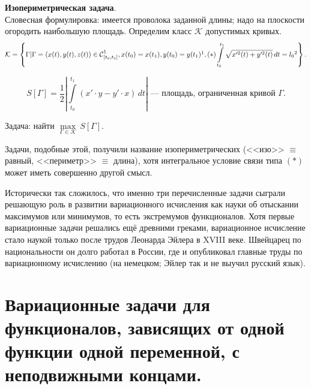 \documentclass[12pt,a4paper,openany,fleqn]{book}
\newcommand{\Cf}{\ensuremath{\mathcal{C}}}
\newcommand{\mc}[1]{\ensuremath{\mathcal{#1}}}
\newcommand{\Cfn}[2][]{\ensuremath{\Cf{\mathstrut}^{#2}_{#1}}}
\theoremstyle{definition}
\begin{document}
\begin{enumerate2}
		\item \textbf{Изопериметрическая задача}.\\
		Словесная формулировка: имеется проволока заданной длины; надо на плоскости огородить наибольшую площадь. Определим класс $\mc{K}$ допустимых кривых.
		\label{l1:eq:Isoperimetr} 
		\begin{equation*}
			\mc{K}=\left\{\Gamma|\Gamma=(x(t),y(t),z(t))\in\Cfn[{[t_0,t_1]}]{1}, x(t_0)=x(t_1), y(t_0)=y(t_1)\footnotemark{}, (*)\int\limits_{t_0}^{t_1}\sqrt{x^{\prime 2}(t)+y^{\prime 2}(t)}\,dt=l_0\footnotemark{}\right\}.
		\end{equation*}
		\addtocounter{footnote}{-1}\addtocounter{footnote}{1}
		\begin{equation*}
			S[\Gamma]=\frac12\left|\int\limits_{t_0}^{t_1}\left(x'\cdot y-y'\cdot x\right)\,dt\right|\text{ --- площадь, ограниченная кривой }\Gamma.
		\end{equation*}
		
		Задача: найти $\max\limits_{\Gamma\in\mc{K}}\,S[\Gamma].$
		
		Задачи, подобные этой, получили название изопериметрических (<<изо>> $\equiv$ равный,  <<периметр>> $\equiv$ длина), хотя интегральное условие связи типа $(\hyperref[l1:eq:Isoperimetr]{*})$ может иметь совершенно другой смысл.
	\end{enumerate2}
	
	Исторически так сложилось, что именно три перечисленные задачи сыграли решающую роль в развитии вариационного исчисления как науки об отыскании максимумов или минимумов, то есть экстремумов функционалов. Хотя первые вариационные задачи решались ещё древними греками, вариационное исчисление стало наукой только после трудов Леонарда Эйлера в XVIII веке. Швейцарец по национальности он долго работал в России, где и опубликовал главные труды по вариационному исчислению (на немецком; Эйлер так и не выучил русский язык). 
	
	\section[Задачи с неподвижными концами.]{Вариационные задачи для функционалов, зависящих от одной функции одной переменной, с неподвижными концами.}
	\label{lecture1section2}
	
\end{document}
